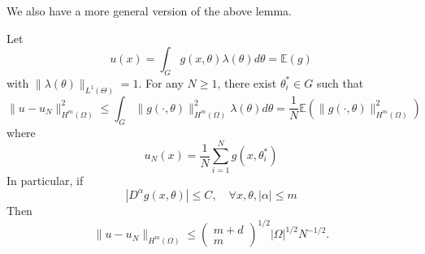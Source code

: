 \iffalse
\begin{proof} 
Note that
\begin{equation}
\label{uv}
u(x) = \|\rho\|_{L^1(G)}\mathbb E (g).
\end{equation}
By Lemma \ref{MC},
$$
\mathbb {E}_n\left(\bigg(\mathbb E(g(x,\cdot))
-\frac{1}{N}\sum_{i=1}^N g(x,\theta_i))\bigg)^2
\right)\le {1\over N} \mathbb E (g^2).
$$
By taking integration w.r.t. $x$ on both sides, we get
$$
\mathbb {E}_n\left(h(\theta_1,\theta_2, \cdots, \theta_N)
\right)\le {1\over N} \mathbb {E} \Big(\int_{\Omega} g^2 d\mu(x)\Big),
$$
where 
$$
h(\theta_1,\theta_2, \cdots, \theta_N) =  \int_{\Omega} \bigg(\mathbb E(g(x,\cdot))
-\frac{1}{N}\sum_{i=1}^N g(x,\theta_i))\bigg)^2 d\mu(x).
$$
Since $\mathbb {E}_N (1) = 1$ and $\mathbb {E}_N (h) \le {1\over N} \mathbb {E} \Big(\int_{\Omega} g^2 d\mu(x)\Big)$, there exist $\theta_i^* \in G$ such that
$$
h(\theta_1^*, \theta_2^*, \cdots, \theta_N^*) \le  {1\over N}  \int_{\Omega} \mathbb {E} (g^2) d\mu(x).
$$
This implies that
$$
	\mathbb{E}_n\|u-u_N\|_{L^2(\Omega)}^2 
	\le\frac{\|\rho\|_{L^1(G)}}{N}
	\int_G \|g(\cdot,\theta)\|_{L^2(\Omega)}^2\lambda(\theta)d\theta.
	$$ 
	The proof for \eqref{eq:hm} is similar to the above analysis for the $L^2$-error analysis, which completes the proof.
\end{proof}
\fi



We also have a more general version of the above lemma.
\begin{lemma}\label{lem:sampleHk}
	Let 
	\begin{equation} \label{uint}
	u(x)=\int_{G}g(x,\theta)\lambda(\theta)d\theta  = \mathbb E (g)
	\end{equation}
	with $\|\lambda(\theta)\|_{L^1(\Theta)}=1$.
	For any $N\ge 1$, there exist $\theta_i^*\in G$ such that
	$$
	\|u-u_N\|_{H^m(\Omega)}^2 
	\le 
	\int_G  \|g(\cdot,\theta)\|_{H^m(\Omega)}^2\lambda(\theta)d\theta
	=\frac{1}{N} \mathbb E (\|g(\cdot,\theta)\|_{H^m(\Omega)}^2)
	$$
	where 
	$$
	u_N(x)=\frac{1}{N}\sum_{i=1}^N g(x,\theta_i^*)
	$$
	In particular, if 
	\begin{equation}
	\label{eq:4}
	|D^\alpha g(x,\theta)|\le C, \quad\forall x, \theta, |\alpha|\le m
	\end{equation}
	Then
	$$
	\|u-u_N\|_{H^m(\Omega)}
	\le 
	\begin{pmatrix}
	m+d\\
	m
	\end{pmatrix}^{1/2}
	|\Omega|^{1/2}
	N^{-1/2}.
	$$
\end{lemma}
